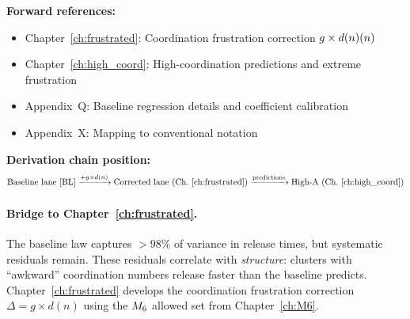 \bigskip
\noindent
\textbf{Forward references:}
\begin{itemize}
    \item Chapter~\ref{ch:frustrated}: Coordination frustration correction
          $g \times d(n)(n)$
    \item Chapter~\ref{ch:high_coord}: High-coordination predictions and extreme
          frustration
    \item Appendix~Q: Baseline regression details and coefficient calibration
    \item Appendix~X: Mapping to conventional notation
\end{itemize}

\bigskip
\noindent
\textbf{Derivation chain position:}
\begin{equation*}
    \text{Baseline lane [BL]}
    \xrightarrow{+ g \times d(n)}
    \text{Corrected lane (Ch.~\ref{ch:frustrated})}
    \xrightarrow{\text{predictions}}
    \text{High-A (Ch.~\ref{ch:high_coord})}
\end{equation*}

\paragraph{Bridge to Chapter~\ref{ch:frustrated}.}
The baseline law captures $> 98\%$ of variance in release times, but
systematic residuals remain. These residuals correlate with \emph{structure}:
clusters with ``awkward'' coordination numbers release faster than the
baseline predicts. Chapter~\ref{ch:frustrated} develops the coordination
frustration correction $\Delta = g \times d(n)$ using the $M_6$ allowed
set from Chapter~\ref{ch:M6}.

